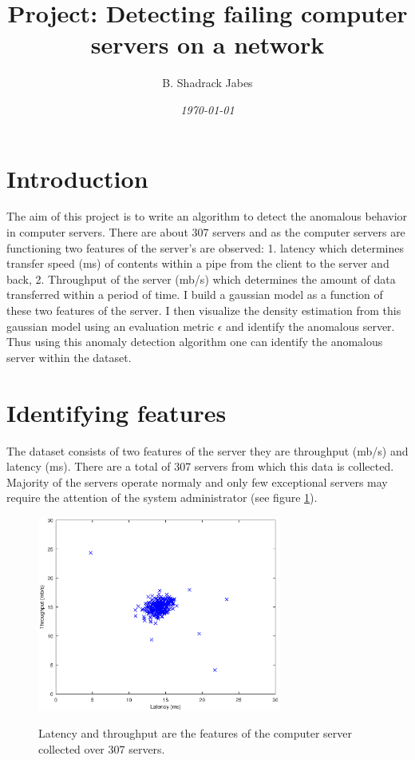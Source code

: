 \documentclass[twocolumn]{article}
\title {Project: Detecting failing computer servers on a network}
\author{B. Shadrack Jabes}
\date{\it{\today}}
\begin{document}
\maketitle

\section{Introduction}
The aim of this project is to write an algorithm to detect the anomalous behavior in computer servers. There are about 307 servers and as the computer servers are functioning two features of the server's are observed: 1. latency which determines transfer speed (ms) of contents within a pipe from the client to the server and back, 2. Throughput of the server (mb/s) which determines the amount of data transferred within a period of time. I build a gaussian model as a function of these two features of the server. I then visualize the density estimation from this gaussian model using an evaluation metric $\epsilon$ and identify the anomalous server. Thus using this anomaly detection algorithm one can identify the anomalous server within the dataset.

\section{Identifying features}
The dataset consists of two features of the server they are throughput (mb/s) and latency (ms). There are a total of 307 servers from which this data is collected. Majority of the servers operate normaly and only few exceptional servers may require the attention of the system administrator (see figure \ref{fig:dataset}).
                \begin{figure}
                \centering
                \includegraphics[clip=true,trim=0cm 0cm 0cm 0cm,width=8cm]{dataset.ps}\\
			\caption{Latency and throughput are the features of the computer server collected over 307 servers.}
                \label{fig:dataset}
                \end{figure}
\end{document}
